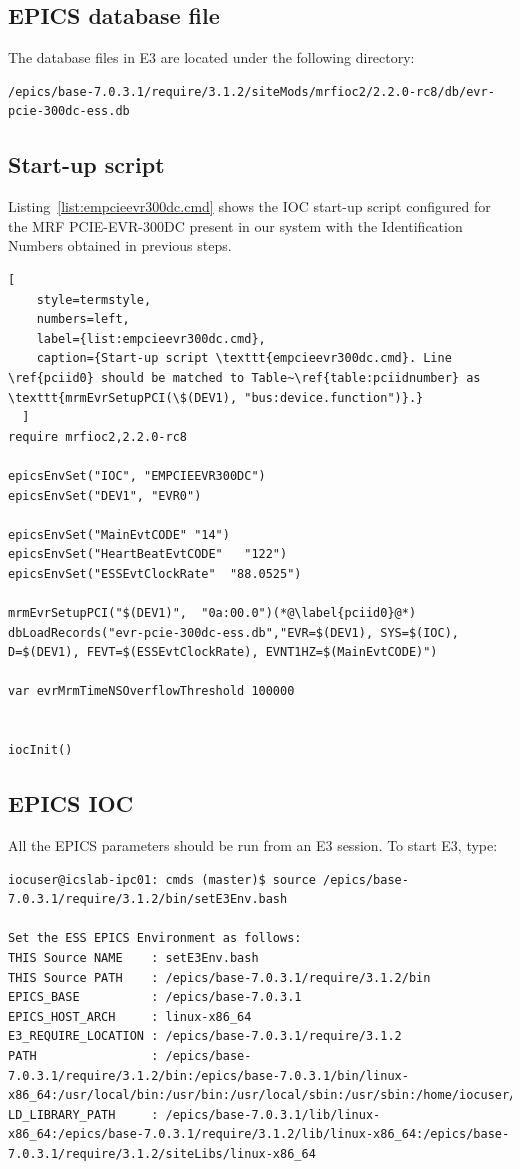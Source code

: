 \documentclass[11pt
  , a4paper
  , article
  , oneside
  , showtrims
]{memoir}
\begin{document}
{\subsection{EPICS database file}
The database files in E3 are located under the following directory:
\begin{lstlisting}[style=termstyle]
/epics/base-7.0.3.1/require/3.1.2/siteMods/mrfioc2/2.2.0-rc8/db/evr-pcie-300dc-ess.db
\end{lstlisting}

\subsection{Start-up script}
Listing~\ref{list:empcieevr300dc.cmd} shows the IOC start-up script configured for the MRF PCIE-EVR-300DC present in our system with the Identification Numbers obtained in previous steps.
\begin{lstlisting}[
    style=termstyle,
    numbers=left,
    label={list:empcieevr300dc.cmd},
    caption={Start-up script \texttt{empcieevr300dc.cmd}. Line \ref{pciid0} should be matched to Table~\ref{table:pciidnumber} as \texttt{mrmEvrSetupPCI(\$(DEV1), "bus:device.function")}.}
  ]
require mrfioc2,2.2.0-rc8

epicsEnvSet("IOC", "EMPCIEEVR300DC")
epicsEnvSet("DEV1", "EVR0")

epicsEnvSet("MainEvtCODE" "14")
epicsEnvSet("HeartBeatEvtCODE"   "122")
epicsEnvSet("ESSEvtClockRate"  "88.0525")

mrmEvrSetupPCI("$(DEV1)",  "0a:00.0")(*@\label{pciid0}@*)
dbLoadRecords("evr-pcie-300dc-ess.db","EVR=$(DEV1), SYS=$(IOC), D=$(DEV1), FEVT=$(ESSEvtClockRate), EVNT1HZ=$(MainEvtCODE)")

var evrMrmTimeNSOverflowThreshold 100000


iocInit()

\end{lstlisting}


\subsection{EPICS IOC}
All the EPICS parameters should be run from an E3 session. To start E3, type:
\begin{lstlisting}[style=termstyle]
iocuser@icslab-ipc01: cmds (master)$ source /epics/base-7.0.3.1/require/3.1.2/bin/setE3Env.bash

Set the ESS EPICS Environment as follows:
THIS Source NAME    : setE3Env.bash
THIS Source PATH    : /epics/base-7.0.3.1/require/3.1.2/bin
EPICS_BASE          : /epics/base-7.0.3.1
EPICS_HOST_ARCH     : linux-x86_64
E3_REQUIRE_LOCATION : /epics/base-7.0.3.1/require/3.1.2
PATH                : /epics/base-7.0.3.1/require/3.1.2/bin:/epics/base-7.0.3.1/bin/linux-x86_64:/usr/local/bin:/usr/bin:/usr/local/sbin:/usr/sbin:/home/iocuser/.local/bin:/home/iocuser/bin
LD_LIBRARY_PATH     : /epics/base-7.0.3.1/lib/linux-x86_64:/epics/base-7.0.3.1/require/3.1.2/lib/linux-x86_64:/epics/base-7.0.3.1/require/3.1.2/siteLibs/linux-x86_64


\end{lstlisting}}
\end{document}

